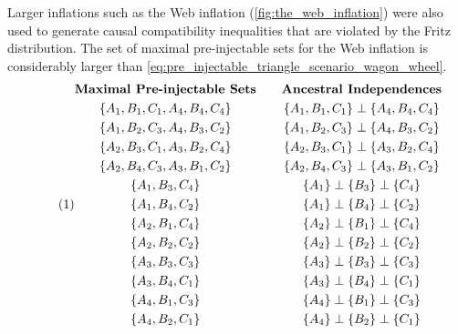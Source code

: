 \documentclass[aps, 10pt, english, twoside, pra, nofootinbib, tightenlines, longbibliography]{revtex4-1}
\begin{document}
    Larger inflations such as the Web inflation (\cref{fig:the_web_inflation}) were also used to generate causal compatibility inequalities that are violated by the Fritz distribution. The set of maximal pre-injectable sets for the Web inflation is considerably larger than \cref{eq:pre_injectable_triangle_scenario_wagon_wheel}.
    \begin{equation*}
        \eq \label{eq:pre_injectable_triangle_scenario_web}
        \begin{gathered}
            \textbf{Maximal Pre-injectable Sets} \\
            \bc{A_1, B_1, C_1, A_4, B_4, C_4} \\
            \bc{A_1, B_2, C_3, A_4, B_3, C_2} \\
            \bc{A_2, B_3, C_1, A_3, B_2, C_4} \\
            \bc{A_2, B_4, C_3, A_3, B_1, C_2} \\
            \bc{A_1, B_3, C_4} \\
            \bc{A_1, B_4, C_2} \\
            \bc{A_2, B_1, C_4} \\
            \bc{A_2, B_2, C_2} \\
            \bc{A_3, B_3, C_3} \\
            \bc{A_3, B_4, C_1} \\
            \bc{A_4, B_1, C_3} \\
            \bc{A_4, B_2, C_1}
        \end{gathered}
        \qquad
        \begin{gathered}
            \textbf{Ancestral Independences} \\
            \bc{A_1, B_1, C_1} \ancestralindep \bc{A_4, B_4, C_4} \\
            \bc{A_1, B_2, C_3} \ancestralindep \bc{A_4, B_3, C_2} \\
            \bc{A_2, B_3, C_1} \ancestralindep \bc{A_3, B_2, C_4} \\
            \bc{A_2, B_4, C_3} \ancestralindep \bc{A_3, B_1, C_2} \\
            \bc{A_1} \ancestralindep \bc{B_3} \ancestralindep \bc{C_4} \\
            \bc{A_1} \ancestralindep \bc{B_4} \ancestralindep \bc{C_2} \\
            \bc{A_2} \ancestralindep \bc{B_1} \ancestralindep \bc{C_4} \\
            \bc{A_2} \ancestralindep \bc{B_2} \ancestralindep \bc{C_2} \\
            \bc{A_3} \ancestralindep \bc{B_3} \ancestralindep \bc{C_3} \\
            \bc{A_3} \ancestralindep \bc{B_4} \ancestralindep \bc{C_1} \\
            \bc{A_4} \ancestralindep \bc{B_1} \ancestralindep \bc{C_3} \\
            \bc{A_4} \ancestralindep \bc{B_2} \ancestralindep \bc{C_1}
        \end{gathered}
    \end{equation*}
\end{document}
